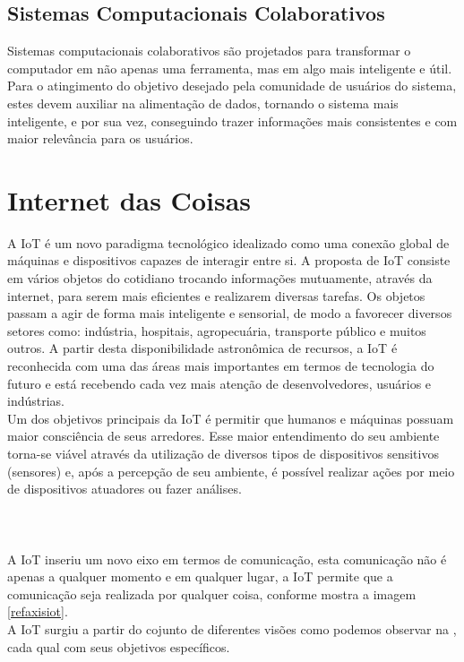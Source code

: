 \subsection{Sistemas Computacionais Colaborativos}
\quad Sistemas computacionais colaborativos são projetados para transformar o computador em não apenas uma ferramenta, mas em algo mais inteligente e útil.
Para o atingimento do objetivo desejado pela comunidade de usuários do sistema, estes devem auxiliar na alimentação de dados,
tornando o sistema mais inteligente, e por sua vez, conseguindo trazer informações mais consistentes e com maior relevância para os usuários.


\section{Internet das Coisas}%
\quad
A \acrlong{IoT} é um novo paradigma tecnológico idealizado como uma conexão global
de máquinas e dispositivos capazes de interagir entre si. A proposta de \acrshort{IoT} consiste em vários objetos do cotidiano trocando informações
mutuamente, através da internet, para serem mais eficientes e realizarem diversas tarefas.
Os objetos passam a agir de forma mais inteligente e sensorial, de modo a favorecer diversos setores como:
indústria, hospitais, agropecuária, transporte público e muitos outros. A partir desta
disponibilidade astronômica de recursos, a \acrshort{IoT} é reconhecida com uma das áreas mais importantes
em termos de tecnologia do futuro e está recebendo cada vez mais atenção de desenvolvedores, usuários e indústrias.
\\ \null
\quad
Um dos objetivos principais da \acrlong{IoT} é permitir
que humanos e máquinas possuam maior consciência de seus arredores.
 Esse maior entendimento do seu ambiente torna-se viável através da utilização
 de diversos tipos de dispositivos sensitivos (sensores) e, após a percepção
 de seu ambiente, é possível realizar ações por meio de dispositivos atuadores ou fazer análises. \\\\\\\\ \null
 \quad A \acrshort{IoT}
 inseriu um novo eixo em termos de comunicação, esta comunicação não é apenas a qualquer momento e em qualquer lugar,
 a \acrlong{IoT} permite que a comunicação seja realizada por qualquer coisa, conforme mostra a imagem \ref{refaxisiot}.
\\ \null
 \quad
 A \acrlong{IoT} surgiu a partir do cojunto de diferentes visões como podemos observar na , cada qual com seus objetivos específicos.
